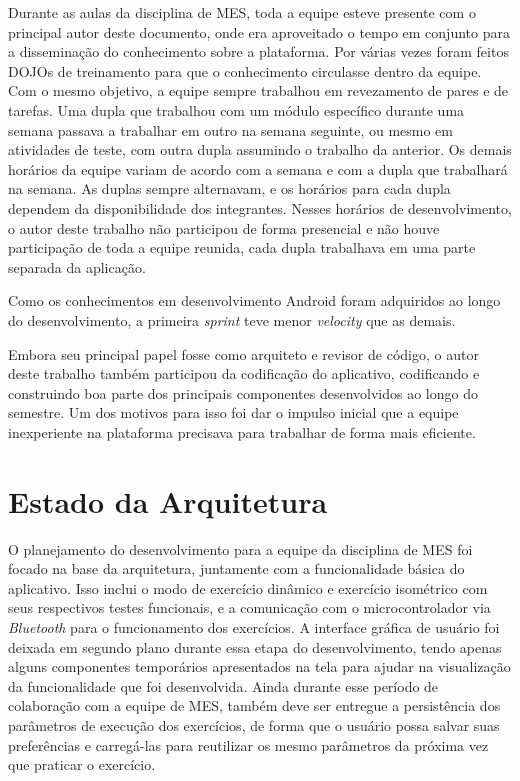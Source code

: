 Durante as aulas da disciplina de MES, toda a equipe esteve presente com o principal autor deste documento, onde era aproveitado o tempo em conjunto para a disseminação do conhecimento sobre a plataforma. Por várias vezes foram feitos DOJOs de treinamento para que o conhecimento circulasse dentro da equipe. Com o mesmo objetivo, a equipe sempre trabalhou em revezamento de pares e de tarefas. Uma dupla que trabalhou com um módulo específico durante uma semana passava a trabalhar em outro na semana seguinte, ou mesmo em atividades de teste, com outra dupla assumindo o trabalho da anterior. Os demais horários da equipe variam de acordo com a semana e com a dupla que trabalhará na semana. As duplas sempre alternavam, e os horários para cada dupla dependem da disponibilidade dos integrantes. Nesses horários de desenvolvimento, o autor deste trabalho não participou de forma presencial e não houve participação de toda a equipe reunida, cada dupla trabalhava em uma parte separada da aplicação.

Como os conhecimentos em desenvolvimento Android foram adquiridos ao longo do desenvolvimento, a primeira \textit{sprint} teve menor \textit{velocity} que as demais.

Embora seu principal papel fosse como arquiteto e revisor de código, o autor deste trabalho também participou da codificação do aplicativo, codificando e construindo boa parte dos principais componentes desenvolvidos ao longo do semestre. Um dos motivos para isso foi dar o impulso inicial que a equipe inexperiente na plataforma precisava para trabalhar de forma mais eficiente.

\section{Estado da Arquitetura}

O planejamento do desenvolvimento para a equipe da disciplina de MES foi focado na base da arquitetura, juntamente com a funcionalidade básica do aplicativo. Isso inclui o modo de exercício dinâmico e exercício isométrico com seus respectivos testes funcionais, e a comunicação com o microcontrolador via \textit{Bluetooth} para o funcionamento dos exercícios. A interface gráfica de usuário foi deixada em segundo plano durante essa etapa do desenvolvimento, tendo apenas alguns componentes temporários apresentados na tela para ajudar na visualização da funcionalidade que foi desenvolvida. Ainda durante esse período de colaboração com a equipe de MES, também deve ser entregue a persistência dos parâmetros de execução dos exercícios, de forma que o usuário possa salvar suas preferências e carregá-las para reutilizar os mesmo parâmetros da próxima vez que praticar o exercício.


